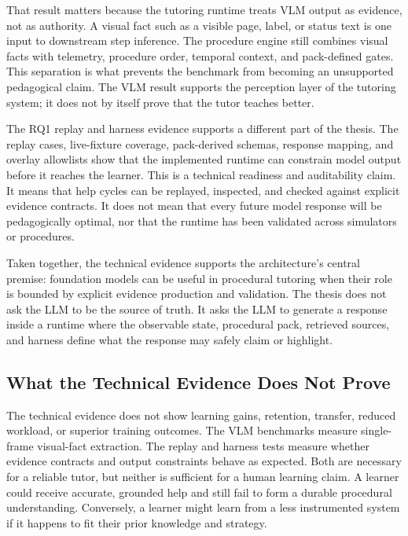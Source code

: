 That result matters because the tutoring runtime treats VLM output as evidence,
not as authority. A visual fact such as a visible page, label, or status text is
one input to downstream step inference. The procedure engine still combines
visual facts with telemetry, procedure order, temporal context, and pack-defined
gates. This separation is what prevents the benchmark from becoming an
unsupported pedagogical claim. The VLM result supports the perception layer of
the tutoring system; it does not by itself prove that the tutor teaches better.

The RQ1 replay and harness evidence supports a different part of the thesis.
The replay cases, live-fixture coverage, pack-derived schemas, response mapping,
and overlay allowlists show that the implemented runtime can constrain model
output before it reaches the learner. This is a technical readiness and
auditability claim. It means that help cycles can be replayed, inspected, and
checked against explicit evidence contracts. It does not mean that every future
model response will be pedagogically optimal, nor that the runtime has been
validated across simulators or procedures.

Taken together, the technical evidence supports the architecture's central
premise: foundation models can be useful in procedural tutoring when their role
is bounded by explicit evidence production and validation. The thesis does not
ask the LLM to be the source of truth. It asks the LLM to generate a response
inside a runtime where the observable state, procedural pack, retrieved sources,
and harness define what the response may safely claim or highlight.

\subsection{What the Technical Evidence Does Not Prove}

The technical evidence does not show learning gains, retention, transfer,
reduced workload, or superior training outcomes. The VLM benchmarks measure
single-frame visual-fact extraction. The replay and harness tests measure
whether evidence contracts and output constraints behave as expected. Both are
necessary for a reliable tutor, but neither is sufficient for a human learning
claim. A learner could receive accurate, grounded help and still fail to form a
durable procedural understanding. Conversely, a learner might learn from a less
instrumented system if it happens to fit their prior knowledge and strategy.

